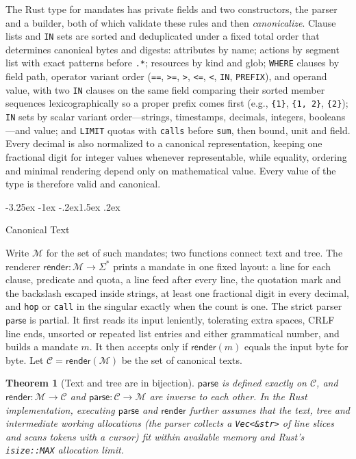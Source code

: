 \documentclass[10pt,twocolumn]{article}
\makeatletter
\theoremstyle{plain}
\newtheorem{theorem}{Theorem}
\theoremstyle{definition}
\renewcommand\subsection{\@startsection{subsection}{2}{\z@}%
  {-3.25ex \@plus -1ex \@minus -.2ex}{1.5ex \@plus .2ex}%
  {\normalfont\large\bfseries\raggedright}}
\makeatother
\begin{document}
The Rust type for mandates has private fields and two constructors, the parser and a builder, both of which validate these rules and then \emph{canonicalize}. Clause lists and \texttt{IN} sets are sorted and deduplicated under a fixed total order that determines canonical bytes and digests: attributes by name; actions by segment list with exact patterns before \texttt{.*}; resources by kind and glob; \texttt{WHERE} clauses by field path, operator variant order (\texttt{==}, \texttt{>=}, \texttt{>}, \texttt{<=}, \texttt{<}, \texttt{IN}, \texttt{PREFIX}), and operand value, with two \texttt{IN} clauses on the same field comparing their sorted member sequences lexicographically so a proper prefix comes first (e.g., \texttt{\{1\}}, \texttt{\{1, 2\}}, \texttt{\{2\}}); \texttt{IN} sets by scalar variant order---strings, timestamps, decimals, integers, booleans---and value; and \texttt{LIMIT} quotas with \texttt{calls} before \texttt{sum}, then bound, unit and field. Every decimal is also normalized to a canonical representation, keeping one fractional digit for integer values whenever representable, while equality, ordering and minimal rendering depend only on mathematical value. Every value of the type is therefore valid and canonical.

\subsection{Canonical Text}
\label{sec:bijection}

Write $\mathcal{M}$ for the set of such mandates; two functions connect text and tree. The renderer $\mathsf{render} : \mathcal{M} \to \Sigma^{*}$ prints a mandate in one fixed layout: a line for each clause, predicate and quota, a line feed after every line, the quotation mark and the backslash escaped inside strings, at least one fractional digit in every decimal, and \texttt{hop} or \texttt{call} in the singular exactly when the count is one. The strict parser $\mathsf{parse}$ is partial. It first reads its input leniently, tolerating extra spaces, CRLF line ends, unsorted or repeated list entries and either grammatical number, and builds a mandate $m$. It then accepts only if $\mathsf{render}(m)$ equals the input byte for byte. Let $\mathcal{C} = \mathsf{render}(\mathcal{M})$ be the set of canonical texts.

\begin{theorem}[Text and tree are in bijection]
\label{thm:bijection}
$\mathsf{parse}$ is defined exactly on $\mathcal{C}$, and $\mathsf{render} : \mathcal{M} \to \mathcal{C}$ and $\mathsf{parse} : \mathcal{C} \to \mathcal{M}$ are inverse to each other. In the Rust implementation, executing $\mathsf{parse}$ and $\mathsf{render}$ further assumes that the text, tree and intermediate working allocations (the parser collects a \texttt{Vec<\&str>} of line slices and scans tokens with a cursor) fit within available memory and Rust's \texttt{isize::MAX} allocation limit.
\end{theorem}
\end{document}
